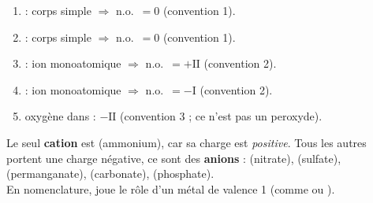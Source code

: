 \documentclass[11pt,a4paper]{article}
\begin{document}
\begin{corrige}
\begin{enumerate}[label=\alph*),leftmargin=1.8em,topsep=1pt,itemsep=1pt]
  \item {} : corps simple $\Rightarrow$ n.o.\ $= 0$ (convention 1).
  \item {} : corps simple $\Rightarrow$ n.o.\ $= 0$ (convention 1).
  \item {} : ion monoatomique $\Rightarrow$ n.o.\ $= +\mathrm{II}$ (convention 2).
  \item {} : ion monoatomique $\Rightarrow$ n.o.\ $= -\mathrm{I}$ (convention 2).
  \item oxygène dans  : $-\mathrm{II}$ (convention 3 ; ce n'est pas un peroxyde).
\end{enumerate}
\end{corrige}

\begin{corrige}
Le seul \textbf{cation} est  (ammonium), car sa charge est \emph{positive}. Tous les autres portent
une charge négative, ce sont des \textbf{anions} :  (nitrate),  (sulfate),
 (permanganate),  (carbonate),  (phosphate). \\
En nomenclature,  joue le rôle d'un métal de valence 1 (comme  ou ).
\end{corrige}
\end{document}
